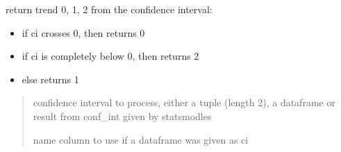 \documentclass[letterpaper,10pt,english]{sphinxmanual}
\begin{document}
\begin{fulllineitems}
\label{\detokenize{source/chowclassifier:chowclassifier.chow.conf_int_to_trend}}
\pysigstartsignatures
{}
\pysigstopsignatures
\sphinxAtStartPar
return trend  0, 1, 2 from the confidence interval:
\begin{itemize}
\item {} 
\sphinxAtStartPar
if ci crosses 0, then returns 0

\item {} 
\sphinxAtStartPar
if ci is completely below 0, then returns 2

\item {} 
\sphinxAtStartPar
else returns 1

\end{itemize}
\begin{quote}\begin{description}
\sphinxAtStartPar
confidence interval to process, either a tuple (length 2), a dataframe or result from conf\_int given by statsmodles

\sphinxAtStartPar
name column to use if a dataframe was given as ci

\end{description}\end{quote}

\end{fulllineitems}

\end{document}
